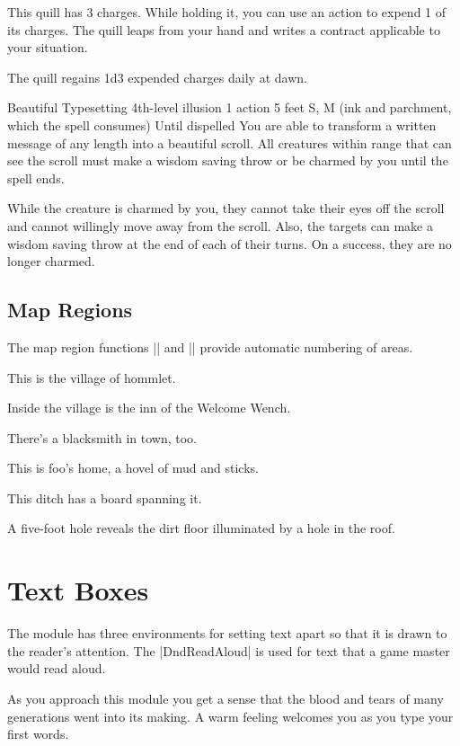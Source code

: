 \documentclass[letterpaper,twocolumn,openany]{dndbook}
\begin{document}
This quill has 3 charges. While holding it, you can use an action to expend 1 of its charges. The quill leaps from your hand and writes a contract applicable to your situation.

The quill regains 1d3 expended charges daily at dawn.

\spellheader%
  {Beautiful Typesetting}
  {4th-level illusion}
  {1 action}
  {5 feet}
  {S, M (ink and parchment, which the spell consumes)}
  {Until dispelled}
You are able to transform a written message of any length into a beautiful scroll. All creatures within range that can see the scroll must make a wisdom saving throw or be charmed by you until the spell ends.

While the creature is charmed by you, they cannot take their eyes off the scroll and cannot willingly move away from the scroll. Also, the targets can make a wisdom saving throw at the end of each of their turns. On a success, they are no longer charmed.

\section{Map Regions}
The map region functions |\area| and |\subarea| provide automatic numbering of areas.

This is the village of hommlet.

Inside the village is the inn of the Welcome Wench.

There's a blacksmith in town, too.

This is foo's home, a hovel of mud and sticks.

This ditch has a board spanning it.

A five-foot hole reveals the dirt floor illuminated by a hole in the roof.

\chapter{Text Boxes}

The module has three environments for setting text apart so that it is drawn to the reader's attention. The |DndReadAloud| is used for text that a game master would read aloud.

\begin{DndReadAloud}
  As you approach this module you get a sense that the blood and tears of many generations went into its making. A warm feeling welcomes you as you type your first words.
\end{DndReadAloud}
\end{document}
